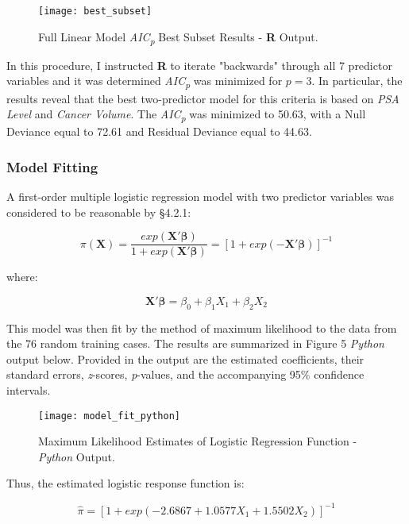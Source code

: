 \begin{figure}[H]
	\centering
	\texttt{[image: best\_subset]}
	\caption{Full Linear Model  \textit{AIC\textsubscript{p}} Best Subset Results - \textbf{R} Output.}
\end{figure}

In this procedure, I instructed \textbf{R} to iterate "backwards" through all 7 predictor variables and it was determined \textit{AIC\textsubscript{p}} was minimized for \(p=3\). In particular, the results reveal that the best two-predictor model for this criteria is based on \textit{PSA Level} and \textit{Cancer Volume}. The \textit{AIC\textsubscript{p}} was minimized to 50.63, with a Null Deviance equal to 72.61 and Residual Deviance equal to 44.63. 

\subsubsection{Model Fitting}
A first-order multiple logistic regression model with two predictor variables was considered to be reasonable by \S4.2.1: 

\begin{equation}
\pi(\textbf{X}) = \frac{exp(\textbf{X}'\boldsymbol{\beta})}{1+exp(\textbf{X}'\boldsymbol{\beta})} = [1+exp(-\textbf{X}'\boldsymbol{\beta})]^{-1}
\end{equation}

where:

\begin{equation}
\textbf{X}'\boldsymbol{\beta} = \beta_0+\beta_1X_1+\beta_2X_2
\end{equation}

This model was then fit by the method of maximum likelihood to the data from the 76 random training cases. The results are summarized in Figure 5 \textit{Python} output below. Provided in the output are the estimated coefficients, their standard errors, \textit{z}-scores, \textit{p}-values, and the accompanying 95\% confidence intervals. \par

\begin{figure}[H]
	\centering
	\texttt{[image: model\_fit\_python]}
	\caption{Maximum Likelihood Estimates of Logistic Regression Function - \textit{Python} Output.}
\end{figure}

Thus, the estimated logistic response function is:

\begin{equation}
\hat{\pi}=[ 1+ exp(-2.6867 + 1.0577X_1 + 1.5502X_2)]^{-1}
\end{equation}

